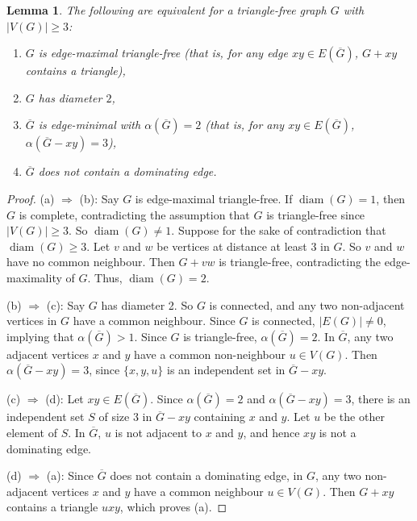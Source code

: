 \documentclass[11pt]{article}
\numberwithin{equation}{section}
\theoremstyle{plain}
\newtheorem{lem}[equation]{Lemma}
\theoremstyle{definition}
\renewcommand{\geq}{\geqslant}
\DeclareMathOperator{\diam}{diam}
\begin{document}
\begin{lem}
    \label{lem:equiv_triangle_free}
    The following are equivalent for a triangle-free graph $G$ with ${|V(G)| \geq 3}$:
    \begin{enumerate}[(\alph*)]
        \item $G$ is edge-maximal triangle-free (that is, for any edge $xy \in E(\overline{G})$,  $G + xy$ contains a triangle),
        \item $G$ has diameter $2$,
        \item $\overline{G}$ is edge-minimal with $\alpha(\overline{G}) = 2$ (that is, for any $xy \in E(\overline{G})$, $\alpha(\overline{G} - xy) = 3$),
        \item $\overline{G}$ does not contain a dominating edge.
    \end{enumerate}
\end{lem}
\begin{proof}
    (a) $\Rightarrow $ (b): Say $G$ is edge-maximal triangle-free. If $\diam(G) = 1$, then $G$ is complete, contradicting the assumption that $G$ is triangle-free since $|V(G)| \geq 3$. So $\diam(G)\neq 1$. Suppose for the sake of contradiction that $\diam(G) \geq 3$. Let $v$ and $w$ be vertices at distance at least $3$ in $G$. So $v$ and $w$ have no common neighbour. Then $G + vw$ is triangle-free, contradicting  the edge-maximality of $G$. Thus, $\diam(G) = 2$.

    (b) $\Rightarrow $ (c):
    Say $G$ has diameter 2. So $G$ is connected, and any two non-adjacent vertices in $G$ have a common neighbour.
    Since $G$ is connected, $|E(G)| \neq 0$, implying that $\alpha(\overline{G}) > 1$. Since $G$ is triangle-free, $\alpha(\overline{G}) = 2$. In $\overline{G}$, any two adjacent vertices $x$ and $y$ have a common non-neighbour $u \in V(G)$. Then $\alpha(\overline{G} - xy) = 3$, since $\{x,y,u\}$ is an independent set in $\overline{G} - xy$.

    (c) $\Rightarrow$ (d): Let $xy \in E(\overline{G})$. Since $\alpha(\overline{G}) = 2$ and $\alpha(\overline{G} - xy) = 3$, there is an independent set $S$ of size $3$ in $\overline{G} - xy$ containing $x$ and $y$. Let $u$ be the other element of $S$. In $\overline{G}$, $u$ is not adjacent to $x$ and $y$, and hence $xy$ is not a dominating edge.

    (d) $\Rightarrow$ (a): Since $\overline{G}$ does not contain a dominating edge, in $G$, any two non-adjacent vertices $x$ and $y$ have a common neighbour $u \in V(G)$. Then $G + xy$ contains a triangle $uxy$, which proves (a).
\end{proof}
\end{document}
